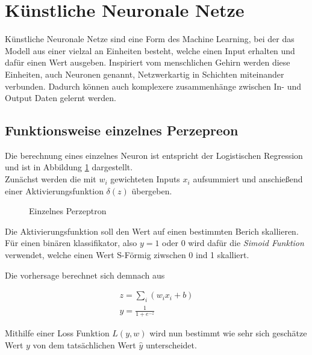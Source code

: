 \section{Künstliche Neuronale Netze} \label{sec:nn}


Künstliche Neuronale Netze sind eine Form des Machine Learning, 
bei der das Modell aus einer vielzal an Einheiten besteht, welche 
einen Input erhalten und dafür einen Wert ausgeben. Inspiriert 
vom menschlichen Gehirn werden diese Einheiten, auch Neuronen genannt, 
Netzwerkartig in Schichten miteinander verbunden. Dadurch können 
auch komplexere zusammenhänge zwischen In- und Output Daten 
gelernt werden.

\subsection{Funktionsweise einzelnes Perzepreon}\label{subsec:percepron}

Die berechnung eines einzelnes Neuron ist entspricht der Logistischen 
Regression und ist in Abbildung \ref{fig:neuron} dargestellt.
\\
Zunächst werden die mit $w_{i}$ gewichteten Inputs $x_{i}$ aufsummiert 
und anschießend einer Aktivierungsfunktion $\delta(z)$ übergeben.

\begin{figure}[htb]
    \centering
    
    \caption{Einzelnes Perzeptron}
    \label{fig:neuron}
\end{figure}

Die Aktivierungsfunktion soll den Wert auf einen bestimmten Berich skallieren.
Für einen binären klassifikator, also $y = 1$ oder $0$ wird dafür die 
\textit{Simoid Funktion} verwendet, welche einen Wert S-Förmig ziwschen 0 ind 1 
skalliert. 

Die vorhersage berechnet sich demnach aus 

\begin{align}
    \label{eq:neuron}
    z = \sum_{i}(w_{i}x_{i} + b)\\
    y = \frac{1}{1 + e^{-z}}
\end{align}

Mithilfe einer Loss Funktion $L(y,w)$ wird nun bestimmt wie sehr sich geschätze 
Wert $y$ von dem tatsächlichen Wert $\hat{y}$ unterscheidet.

